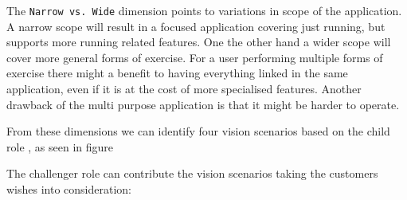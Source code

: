 The \texttt{Narrow vs. Wide} dimension points to variations in scope of the application. A narrow scope will result in a focused application covering just running, but supports more running related features. One the other hand a wider scope will cover more general forms of exercise. For a user performing multiple forms of exercise there might a benefit to having everything linked in the same application, even if it is at the cost of more specialised features. Another drawback of the multi purpose application is that it might be harder to operate.



From these dimensions we can identify four vision scenarios based on the child role  \cite[ pp. 132-134]{essence}, as seen in figure 


The challenger role can contribute the vision scenarios taking the customers wishes into consideration:


